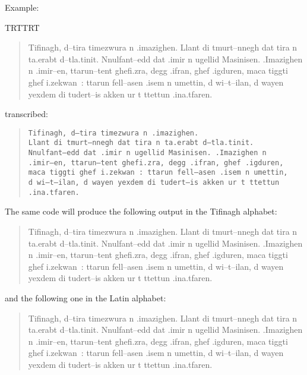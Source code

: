 \documentclass[a4paper,11pt]{article}
\begin{document}
\noindent
Example: 

{\pardir TRT\textdir TRT
\begin{quote}
\pushocplist\ArabicBerberOCP{}\selectfont Tifinagh,
d--tira timezwura n .imazighen.  Llant di tmurt--nnegh dat tira n
ta.erabt d--tla.tinit. Nnulfant--edd dat .imir n ugellid
Masinisen. .Imazighen n .imir--en, ttarun--tent ghefi.zra, degg
.ifran, ghef .igduren, maca tiggti ghef i.zekwan~: ttarun fell--asen
.isem n umettin, d wi--t--ilan, d wayen yexdem di tudert--is akken ur
t ttettun .ina.tfaren.  \popocplist
\end{quote}}

\noindent
transcribed:

\begin{quote}\small
\texttt{Tifinagh, d--tira timezwura n .imazighen.\\ 
Llant di tmurt--nnegh dat tira n ta.erabt d--tla.tinit.\\
Nnulfant--edd dat .imir n ugellid Masinisen. .Imazighen n\\
.imir--en, ttarun--tent ghefi.zra, degg .ifran, ghef .igduren,\\
maca tiggti ghef i.zekwan~: ttarun fell--asen .isem n umettin,\\ 
d wi--t--ilan, d wayen yexdem di tudert--is akken ur t ttettun\\
.ina.tfaren.}
\end{quote}

\noindent
The same code will produce the following output in the Tifinagh alphabet:

\begin{quote}
\begin{tifinagh}Tifinagh, d--tira timezwura n .imazighen. 
Llant di tmurt--nnegh dat tira n ta.erabt d--tla.tinit.  Nnulfant--edd
dat .imir n ugellid Masinisen. .Imazighen n .imir--en, ttarun--tent
ghefi.zra, degg .ifran, ghef .igduren, maca tiggti ghef i.zekwan~:
ttarun fell--asen .isem n umettin, d wi--t--ilan, d wayen yexdem di
tudert--is akken ur t ttettun .ina.tfaren.\end{tifinagh}
\end{quote}

\noindent
and the following one in the Latin alphabet:

\begin{quote}
\begin{latberber}Tifinagh, d--tira timezwura n .imazighen. 
Llant di tmurt--nnegh dat tira n ta.erabt d--tla.tinit.  Nnulfant--edd
dat .imir n ugellid Masinisen. .Imazighen n .imir--en, ttarun--tent
ghefi.zra, degg .ifran, ghef .igduren, maca tiggti ghef i.zekwan~:
ttarun fell--asen .isem n umettin, d wi--t--ilan, d wayen yexdem di
tudert--is akken ur t ttettun .ina.tfaren.\end{latberber}
\end{quote}
\end{document}
